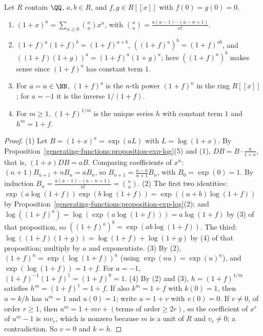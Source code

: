 \begin{theorem}\label{generating-functions:theorem-binomial-series}
Let $R$ contain $\QQ$, $a, b \in R$, and $f, g \in R[[x]]$ with $f(0) = g(0) = 0$.
\begin{enumerate}
\item $(1 + x)^a = \sum_{n \geq 0}\binom{a}{n}x^n$, with $\binom{a}{n} = \frac{a(a - 1) \cdots (a - n + 1)}{n!}$.
\item $(1 + f)^a(1 + f)^b = (1 + f)^{a+b}$, $((1 + f)^a)^b = (1 + f)^{ab}$, and $((1 + f)(1 + g))^a = (1 + f)^a(1 + g)^a$; here $((1 + f)^a)^b$ makes sense since $(1 + f)^a$ has constant term $1$.
\item For $a = n \in \NN$, $(1 + f)^a$ is the $n$-th power $(1 + f)^n$ in the ring $R[[x]]$; for $a = -1$ it is the inverse $1/(1 + f)$.
\item For $m \geq 1$, $(1 + f)^{1/m}$ is the unique series $h$ with constant term $1$ and $h^m = 1 + f$.
\end{enumerate}
\end{theorem}

\begin{proof}
(1) Let $B = (1 + x)^a = \exp(aL)$ with $L = \log(1 + x)$. By Proposition~\ref{generating-functions:proposition-exp-log}(5) and (1), $DB = B \cdot \frac{a}{1 + x}$, that is, $(1 + x)DB = aB$.
Comparing coefficients of $x^n$: $(n + 1)B_{n+1} + nB_n = aB_n$, so $B_{n+1} = \frac{a - n}{n + 1}B_n$, with $B_0 = \exp(0) = 1$. By induction $B_n = \frac{a(a - 1) \cdots (a - n + 1)}{n!} = \binom{a}{n}$.
(2) The first two identities: $\exp(a\log(1 + f))\exp(b\log(1 + f)) = \exp((a + b)\log(1 + f))$ by Proposition~\ref{generating-functions:proposition-exp-log}(2); and
$\log((1 + f)^a) = \log(\exp(a\log(1 + f))) = a\log(1 + f)$ by (3) of that proposition, so $((1 + f)^a)^b = \exp(ab\log(1 + f))$. The third: $\log((1 + f)(1 + g)) = \log(1 + f) + \log(1 + g)$
by (4) of that proposition; multiply by $a$ and exponentiate.
(3) By (2), $(1 + f)^{n} = \exp(\log(1 + f))^n$ (using $\exp(nu) = \exp(u)^n$), and $\exp(\log(1 + f)) = 1 + f$. For $a = -1$, $(1 + f)^{-1}(1 + f)^1 = (1 + f)^0 = 1$.
(4) By (2) and (3), $h = (1 + f)^{1/m}$ satisfies $h^m = (1 + f)^{1} = 1 + f$. If also $k^m = 1 + f$ with $k(0) = 1$, then $u = k/h$ has $u^m = 1$ and $u(0) = 1$; write $u = 1 + v$ with
$v(0) = 0$. If $v \neq 0$, of order $r \geq 1$, then $u^m = 1 + mv + (\text{terms of order} \geq 2r)$, so the coefficient of $x^r$ of $u^m - 1$ is $mv_r$, which is nonzero because $m$ is a unit of $R$ and $v_r \neq 0$; a contradiction. So $v = 0$ and $k = h$.
\end{proof}

